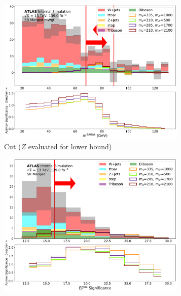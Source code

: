 \begin{figure}[htbp]
\begin{subfigure}[t]{0.48\textwidth}
    \centering
     \includegraphics[width = 0.99\textwidth]{Figures/5/SR1L_Merged_mWgt/TARJets10_mTAR0_N_1.pdf}
     \caption{\mTAR Cut  (\(Z\) evaluated for lower bound)}
    \end{subfigure}
    \begin{subfigure}[t]{0.48\textwidth}
    \centering
     \includegraphics[width = 0.99\textwidth]{Figures/5/SR1L_Merged/MetTST_Significance_N_1.pdf}
    \caption{\metsig}
    \end{subfigure}
    \begin{subfigure}[t]{0.48\textwidth}
    \centering

\end{subfigure}
\end{figure}
